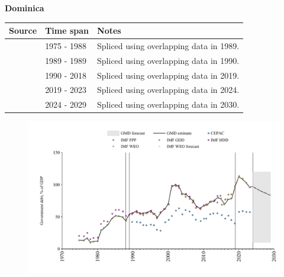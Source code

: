 \documentclass[12pt,a4paper,landscape]{article}
\begin{document}
\begin{adjustbox}{max totalsize={\paperwidth}{\paperheight},center}
\begin{minipage}[t][\textheight][t]{\textwidth}
\vspace*{0.5cm}
{}
\begin{center}
{\Large\bfseries Dominica}
\end{center}
\vspace{0.5cm}
\begin{table}[H]
\centering
\small
\begin{tabular}{|l|l|l|}
\hline
\textbf{Source} & \textbf{Time span} & \textbf{Notes} \\
\hline
\rowcolor{white}\cite{IMF_GDD}& 1975 - 1988 &Spliced using overlapping data in 1989.\\
\rowcolor{lightgray}\cite{IMF_HDD}& 1989 - 1989 &Spliced using overlapping data in 1990.\\
\rowcolor{white}\cite{IMF_GDD}& 1990 - 2018 &Spliced using overlapping data in 2019.\\
\rowcolor{lightgray}\cite{IMF_FPP}& 2019 - 2023 &Spliced using overlapping data in 2024.\\
\rowcolor{white}\cite{IMF_WEO_forecast}& 2024 - 2029 &Spliced using overlapping data in 2030.\\
\hline
\end{tabular}
\end{table}
\begin{figure}[H]
\centering
\includegraphics[width=\textwidth,height=0.6\textheight,keepaspectratio]{graphs/DMA_govdebt_GDP.pdf}
\end{figure}
\end{minipage}
\end{adjustbox}
\end{document}
